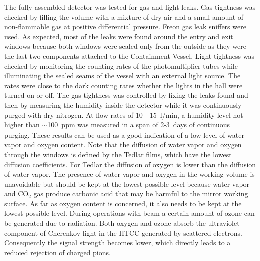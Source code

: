 The fully assembled detector was tested for gas and light leaks. Gas tightness was checked by filling the volume
with a mixture of dry air and a small amount of non-flammable gas at positive differential pressure. Freon gas leak
sniffers were used. As expected, most of the leaks were found around the entry and exit windows because both
windows were sealed only from the outside as they were the last two components attached to the Containment
Vessel. Light tightness was checked by monitoring the counting rates of the photomultiplier tubes while illuminating
the sealed seams of the vessel with an external light source. The rates were close to the dark counting rates whether
the lights in the hall were turned on or off. The gas tightness was controlled by fixing the leaks found and then by
measuring the humidity inside the detector while it was continuously purged with dry nitrogen. At flow rates of
10 - 15~l/min, a humidity level not higher than $\sim$100~ppm was measured in a span of 2-3~days of continuous
purging. These results can be used as a good indication of a low level of water vapor and oxygen content. Note that
the diffusion of water vapor and oxygen through the windows is defined by the Tedlar films, which have the lowest
diffusion coefficients. For Tedlar the diffusion of oxygen is lower than the diffusion of water vapor. The presence of
water vapor and oxygen in the working volume is unavoidable but should be kept at the lowest possible level because
water vapor and CO${_2}$ gas produce carbonic acid that may be harmful to the mirror working surface. As far as
oxygen content is concerned, it also needs to be kept at the lowest possible level. During operations with beam a
certain amount of ozone can be generated due to radiation. Both oxygen and ozone absorb the ultraviolet component
of Cherenkov light in the HTCC generated by scattered electrons. Consequently the signal strength becomes lower,
which directly leads to a reduced rejection of charged pions.


